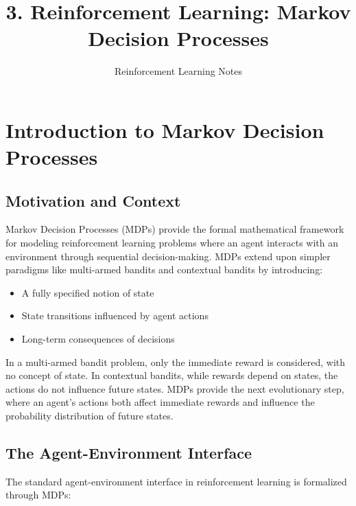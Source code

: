\documentclass[12pt,a4paper]{article}
\title{3. Reinforcement Learning: Markov Decision Processes}
\author{Reinforcement Learning Notes}
\begin{document}
\maketitle
\tableofcontents
\newpage

\section{Introduction to Markov Decision Processes}

\subsection{Motivation and Context}

Markov Decision Processes (MDPs) provide the formal mathematical framework for modeling reinforcement learning problems where an agent interacts with an environment through sequential decision-making. MDPs extend upon simpler paradigms like multi-armed bandits and contextual bandits by introducing:

\begin{itemize}
    \item A fully specified notion of state
    \item State transitions influenced by agent actions
    \item Long-term consequences of decisions
\end{itemize}

In a multi-armed bandit problem, only the immediate reward is considered, with no concept of state. In contextual bandits, while rewards depend on states, the actions do not influence future states. MDPs provide the next evolutionary step, where an agent's actions both affect immediate rewards and influence the probability distribution of future states.

\subsection{The Agent-Environment Interface}

The standard agent-environment interface in reinforcement learning is formalized through MDPs:
\end{document}
